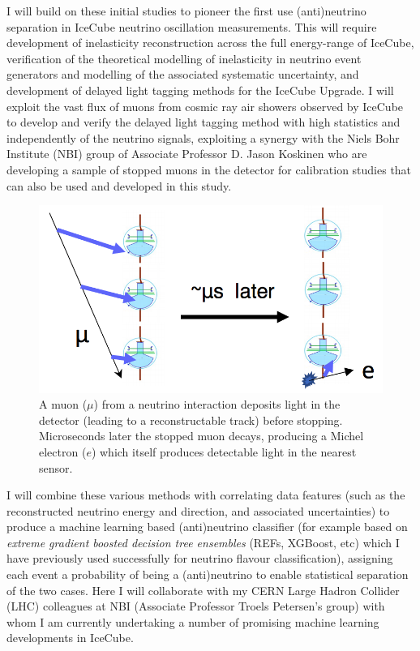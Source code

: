 \documentclass[a4paper,11pt]{article}
\begin{document}
I will build on these initial studies to pioneer the first use (anti)neutrino separation in IceCube neutrino oscillation measurements. This will require development of inelasticity reconstruction across the full energy-range of IceCube, verification of the theoretical modelling of inelasticity in neutrino event generators and modelling of the associated systematic uncertainty, and development of delayed light tagging methods for the IceCube Upgrade. I will exploit the vast flux of muons from cosmic ray air showers observed by IceCube to develop and verify the delayed light tagging method with high statistics and independently of the neutrino signals, exploiting a synergy with the Niels Bohr Institute (NBI) group of Associate Professor D. Jason Koskinen who are developing a sample of stopped muons in the detector for calibration studies that can also be used and developed in this study. 

\begin{figure} %
    \centering
    \includegraphics[trim=0.0cm 0.0cm 0.0cm 0.0cm, clip=true, width=\linewidth]{images/michel_electron.png}
    \caption{A muon ($\mu$) from a neutrino interaction deposits light in the detector (leading to a reconstructable track) before stopping. Microseconds later the stopped muon decays, producing a Michel electron ($e$) which itself produces detectable light in the nearest sensor. }
    \label{fig:michel_electron}
\end{figure}

I will combine these various methods with correlating data features (such as the reconstructed neutrino energy and direction, and associated uncertainties) to produce a machine learning based (anti)neutrino classifier (for example based on \textit{extreme gradient boosted decision tree ensembles} (REFs, XGBoost, etc) which I have previously used successfully for neutrino flavour classification), assigning each event a probability of being a (anti)neutrino to enable statistical separation of the two cases. Here I will collaborate with my CERN Large Hadron Collider (LHC) colleagues at NBI (Associate Professor Troels Petersen's group) with whom I am currently undertaking a number of promising machine learning developments in IceCube.
\end{document}
